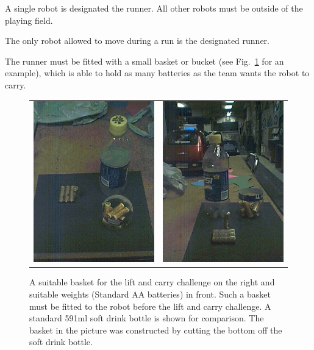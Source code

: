 \documentclass[12pt]{hurocup}
\begin{document}
\begin{lawlist}[LC]

\item A single robot is designated the runner. All other robots
  must be outside of the playing field.

\item The only robot allowed to move during a run is the
  designated runner.

\item The runner must be fitted with a small basket or bucket (see
  Fig.~\ref{fig:robot-lift-and-carry-basket} for an example), which is
  able to hold as many batteries as the team wants the robot to carry.

  \begin{figure}
    \begin{center}
      \begin{tabular}{cc}
        \includegraphics[width=0.40\linewidth]{Figures/robot-lift-and-carry-basket}
        &
        \includegraphics[width=0.40\linewidth]{Figures/robot-lift-and-carry-basket2}
        \\
      \end{tabular}
    \end{center}
    \caption{A suitable basket for the lift and carry challenge on the
      right and suitable weights (Standard AA batteries) in front.
      Such a basket must be fitted to the robot before the lift and
      carry challenge. A standard 591ml soft drink bottle is shown for
      comparison. The basket in the picture was constructed by cutting
      the bottom off the soft drink bottle.}
    \label{fig:robot-lift-and-carry-basket}
  \end{figure}


\end{lawlist}
\end{document}
